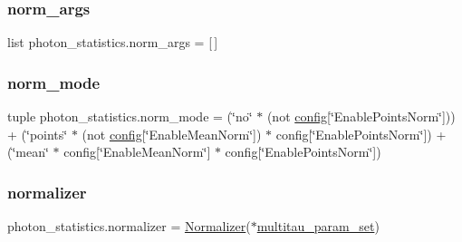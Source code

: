 \mbox{\label{namespacephoton__statistics_af558fed5a93a7b134efea382f1ad4007}} 
\subsubsection{\texorpdfstring{norm\+\_\+args}{norm\_args}}
{\footnotesize\ttfamily list photon\+\_\+statistics.\+norm\+\_\+args = \mbox{[}$\,$\mbox{]}}

\mbox{\label{namespacephoton__statistics_a28a89caae4538b504046ed301158e677}} 
\subsubsection{\texorpdfstring{norm\+\_\+mode}{norm\_mode}}
{\footnotesize\ttfamily tuple photon\+\_\+statistics.\+norm\+\_\+mode = (\char`\"{}no\char`\"{} $\ast$ (not \hyperlink{namespacephoton__statistics_a4176c548148b1c86da6ddf320ab00e90}{config}\mbox{[}\char`\"{}Enable\+Points\+Norm\char`\"{}\mbox{]})) + (\char`\"{}points\char`\"{} $\ast$ (not \hyperlink{namespacephoton__statistics_a4176c548148b1c86da6ddf320ab00e90}{config}\mbox{[}\char`\"{}Enable\+Mean\+Norm\char`\"{}\mbox{]}) $\ast$ config\mbox{[}\char`\"{}Enable\+Points\+Norm\char`\"{}\mbox{]}) + (\char`\"{}mean\char`\"{} $\ast$ config\mbox{[}\char`\"{}Enable\+Mean\+Norm\char`\"{}\mbox{]} $\ast$ config\mbox{[}\char`\"{}Enable\+Points\+Norm\char`\"{}\mbox{]})}

\mbox{\label{namespacephoton__statistics_a4476861cf199e5ef481ee4bc15e08847}} 
\subsubsection{\texorpdfstring{normalizer}{normalizer}}
{\footnotesize\ttfamily photon\+\_\+statistics.\+normalizer = \hyperlink{classnormalizer_1_1Normalizer}{Normalizer}($\ast$\hyperlink{namespacephoton__statistics_a3c57d728c4b1cdcb2b6ca63bc6adfc4d}{multitau\+\_\+param\+\_\+set})}

